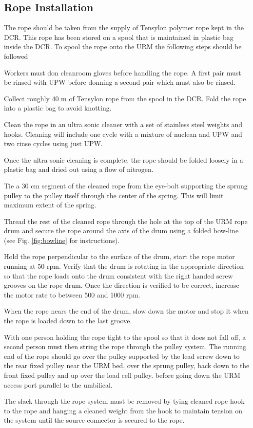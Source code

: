 \documentclass[11pt]{article}
\begin{document}
\subsection{Rope Installation}\label{ss:RopeInstall}
The rope should be taken from the supply of Tensylon polymer rope kept
in the DCR. This rope has been stored on a spool that is maintained in
plastic bag inside the DCR. To spool the rope onto the URM the
following steps should be followed
\begin{answerlist}
\item Workers must don cleanroom gloves before handling the rope. A
  first pair must be rinsed with UPW before donning a second pair
  which must also be rinsed.
\item Collect roughly 40 m of Tensylon rope from the spool in the
  DCR. Fold the rope into a plastic bag to avoid knotting.
\item Clean the rope in an ultra sonic cleaner with a set of stainless
  steel weights and hooks. Cleaning will include one cycle with a
  mixture of nuclean and UPW and two rinse cycles using just UPW.
\item Once the ultra sonic cleaning is complete, the rope should be
  folded loosely in a plastic bag and dried out using a flow of
  nitrogen.
\item Tie a 30 cm segment of the cleaned rope from the eye-bolt
  supporting the sprung pulley to the pulley itself through the center
  of the spring. This will limit maximum extent of the spring.
\item Thread the rest of the cleaned rope through the hole at the top
  of the URM rope drum and secure the rope around the axis of the drum
  using a folded bow-line (see Fig. \ref{fig:bowline} for
  instructions).
\item Hold the rope perpendicular to the surface of the drum, start
  the rope motor running at 50 rpm. Verify that the drum is rotating
  in the appropriate direction so that the rope loads onto the drum
  consistent with the right handed screw grooves on the rope
  drum. Once the direction is verified to be correct, increase the
  motor rate to between 500 and 1000 rpm.
\item When the rope nears the end of the drum, slow down the motor and
  stop it when the rope is loaded down to the last groove.
\item With one person holding the rope tight to the spool so that it
  does not fall off, a second person must then string the rope through
  the pulley system. The running end of the rope should go over the
  pulley supported by the lead screw down to the rear fixed pulley
  near the URM bed, over the sprung pulley, back down to the front
  fixed pulley and up over the load cell pulley. before going down the
  URM access port parallel to the umbilical.
\item The slack through the rope system must be removed by tying
  cleaned rope hook to the rope and hanging a cleaned weight from the
  hook to maintain tension on the system until the source connector is
  secured to the rope.
\end{answerlist}
\end{document}
